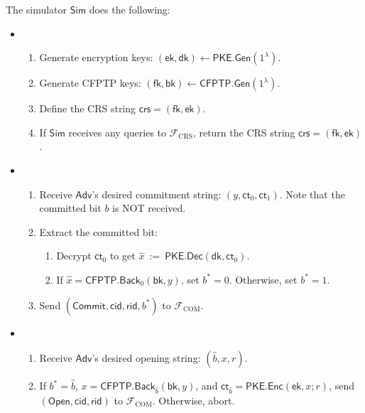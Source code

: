 \documentclass[11pt,letterpaper]{article}
\newcommand{\doclearpage}{%
  \iffull\clearpage\else\fi
}
\theoremstyle{plain} %
\theoremstyle{definition} %
\theoremstyle{remark} %
\newcommand{\eqdef}{\ {:=} \ }
\newcommand{\OpenMsg}{\mathsf{Open}}
\newcommand{\CommitMsg}{\mathsf{Commit}}
\newcommand{\Input}{x}
\newcommand{\SecParam}{\lambda}
\newcommand{\PKE}{\mathsf{PKE}}
\newcommand{\Gen}{\mathsf{Gen}}
\newcommand{\Enc}{\mathsf{Enc}}
\newcommand{\Dec}{\mathsf{Dec}}
\newcommand{\EncKey}{\mathsf{ek}}
\newcommand{\DecKey}{\mathsf{dk}}
\newcommand{\ExtBit}{b^*}
\newcommand{\AdvBit}{\Adv{b}}
\newcommand{\Ct}{\mathsf{ct}}
\newcommand{\Rand}{r}
\newcommand{\CFPTP}{\mathsf{CFPTP}}
\newcommand{\Back}{\mathsf{Back}}
\newcommand{\ForwKey}{\mathsf{fk}}
\newcommand{\BackKey}{\mathsf{bk}}
\newcommand{\Output}{y}
\newcommand{\Simulator}{{\mathsf{Sim}}} %
\newcommand{\Adversary}{{\mathsf{Adv}}} %
\newcommand{\Adv}[1]{\hat{#1}} %
\newcommand{\IF}{\mathcal{F}} %
\newcommand{\CommitterId}{\mathsf{cid}}
\newcommand{\ReceiverId}{\mathsf{rid}}
\newcommand{\IFCrs}{\IF_{\mathrm{CRS}}}
\newcommand{\crs}{\mathsf{crs}}
\newcommand{\IFCom}{\IF_{\mathrm{COM}}}
\newcommand{\CommBit}{b}
\begin{document}
The simulator $\Simulator$ does the following:
\begin{itemize}
\item \parhead{Simulate $\IFCrs$}
\begin{enumerate}[nolistsep]
    \item Generate encryption keys: $(\EncKey, \DecKey) \gets \PKE.\Gen(1^{\SecParam})$.
    \item Generate CFPTP keys: $(\ForwKey,\BackKey) \gets \CFPTP.\Gen(1^{\SecParam})$.
    \item Define the CRS string $\crs = (\ForwKey, \EncKey)$.
    \item If $\Simulator$ receives any queries to $\IFCrs$, return the CRS string $\crs = (\ForwKey, \EncKey)$.
\end{enumerate}

\item {}
\begin{enumerate}[nolistsep]
    \item Receive $\Adversary$'s desired commitment string: $(\Output, \Ct_0, \Ct_1)$. Note that the committed bit $\CommBit$ is NOT received.
    \item Extract the committed bit:
    \begin{enumerate}[nolistsep]
        \item Decrypt $\Ct_0$ to get $\Adv{\Input} \eqdef \PKE.\Dec(\DecKey, \Ct_0)$.
        \item If $\Adv{\Input} = \CFPTP.\Back_0(\BackKey, \Output)$, set $\ExtBit = 0$. Otherwise, set $\ExtBit = 1$.
    \end{enumerate}
    \item Send $(\CommitMsg, \CommitterId, \ReceiverId, \ExtBit)$ to $\IFCom$.
\end{enumerate}

\item {}
\begin{enumerate}[nolistsep]
    \item Receive $\Adversary$'s desired opening string: $(\AdvBit, \Input, \Rand)$.
	\item If $\ExtBit = \AdvBit$, $\Input = \CFPTP.\Back_{\AdvBit}(\BackKey, \Output)$, and $\Ct_{\AdvBit} = \PKE.\Enc(\EncKey, \Input; \Rand)$, send $(\OpenMsg, \CommitterId, \ReceiverId)$ to $\IFCom$. Otherwise, abort.
\end{enumerate}

\end{itemize}

\doclearpage
{\small{


}}
\end{document}
